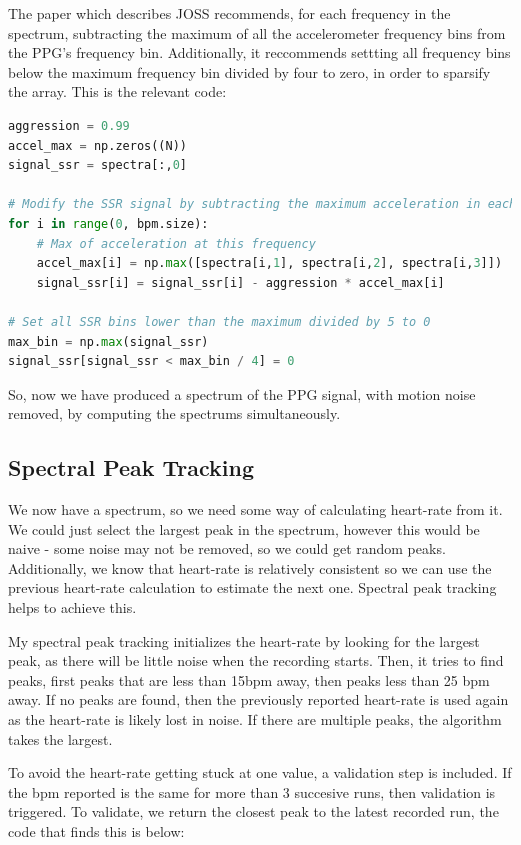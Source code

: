 \documentclass[12pt,a4paper,twoside,openright]{report}
\begin{document}
The paper which describes JOSS recommends, for each frequency in the spectrum,
subtracting the maximum of all the accelerometer frequency bins from the PPG's
frequency bin. Additionally, it reccommends settting all frequency bins below 
the maximum frequency bin divided by four to zero, in order to sparsify the array.
This is the relevant code:

\begin{lstlisting}[language=Python]
aggression = 0.99
accel_max = np.zeros((N))
signal_ssr = spectra[:,0]

# Modify the SSR signal by subtracting the maximum acceleration in each bin
for i in range(0, bpm.size):
    # Max of acceleration at this frequency
    accel_max[i] = np.max([spectra[i,1], spectra[i,2], spectra[i,3]])
    signal_ssr[i] = signal_ssr[i] - aggression * accel_max[i]

# Set all SSR bins lower than the maximum divided by 5 to 0
max_bin = np.max(signal_ssr)
signal_ssr[signal_ssr < max_bin / 4] = 0
\end{lstlisting}

So, now we have produced a spectrum of the PPG signal, with motion noise
removed, by computing the spectrums simultaneously.

\subsection{Spectral Peak Tracking}

We now have a spectrum, so we need some way of calculating heart-rate from it.
We could just select the largest peak in the spectrum, however this would be
naive - some noise may not be removed, so we could get random peaks.
Additionally, we know that heart-rate is relatively consistent so we can use
the previous heart-rate calculation to estimate the next one. Spectral peak
tracking helps to achieve this.

My spectral peak tracking initializes the heart-rate by looking for the
largest peak, as there will be little noise when the recording starts. Then,
it tries to find peaks, first peaks that are less than 15bpm away, then peaks
less than 25 bpm away. If no peaks are found, then the previously reported
heart-rate is used again as the heart-rate is likely lost in noise. If there
are multiple peaks, the algorithm takes the largest.

To avoid the heart-rate getting stuck at one value, a validation step is
included. If the bpm reported is the same for more than 3 succesive runs, then
validation is triggered. To validate, we return the closest peak to the latest
recorded run, the code that finds this is below:
\end{document}
